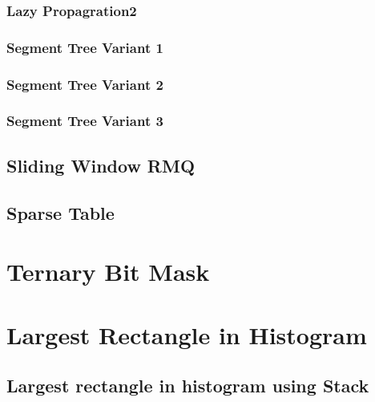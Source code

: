 \documentclass[11pt]{report}
\begin{document}
\subsubsection{Lazy Propagration2}

\subsubsection{Segment Tree Variant 1}

\newpage
\subsubsection{Segment Tree Variant 2}

\subsubsection{Segment Tree Variant 3}

\subsection{Sliding Window RMQ}

\newpage
\subsection{Sparse Table}



\section{Ternary Bit Mask}


\section{Largest Rectangle in Histogram }
\subsection{Largest rectangle in histogram using Stack}

\end{document}

